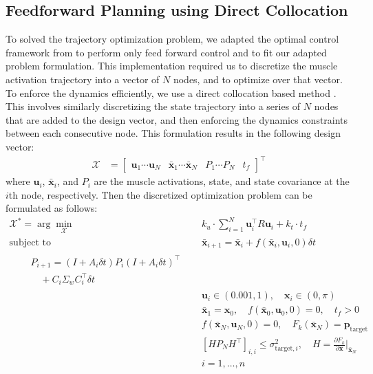 \documentclass[letterpaper, 10pt, conference]{ieeeconf}
\begin{document}
\subsection{Feedforward Planning using Direct Collocation}
To solved the trajectory optimization problem, we adapted the optimal control framework from \cite{stochastic_model} to perform only feed forward control and to fit our adapted problem formulation. This implementation required us to discretize the muscle activation trajectory into a vector of $N$ nodes, and to optimize over that vector. To enforce the dynamics efficiently, we use a direct collocation based method \cite{direct_collocation}. This involves similarly discretizing the state trajectory into a series of $N$ nodes that are added to the design vector, and then enforcing the dynamics constraints between each consecutive node. This formulation results in the following design vector:
\begin{align}
    \mathcal{X} &= \begin{bmatrix}
        \mathbf{u}_1  \cdots \mathbf{u}_N & \mathbf{\bar{x}}_1 \cdots \mathbf{\bar{x}}_N & P_1 \cdots P_N & t_f
    \end{bmatrix}^\top
\end{align}
where $\mathbf{u}_i$, $\mathbf{\bar{x}}_i$, and $P_i$ are the muscle activations, state, and state covariance at the $i$th node, respectively. Then the discretized optimization problem can be formulated as follows:
\begin{align}
    \mathcal{X}^* = \arg\min_{\mathcal{X}} &\quad k_u \cdot \sum_{i=1}^{N} \mathbf{u}_i^\top R \mathbf{u}_i + k_t \cdot t_f \label{eq:dcost} \\
    \text{subject to} &\quad \mathbf{\bar{x}}_{i+1} = \mathbf{\bar{x}}_i + f(\mathbf{\bar{x}}_i, \mathbf{u}_i, 0) \delta t \\
    \begin{split}
        &\quad P_{i+1} = (I + A_i \delta t)P_i(I + A_i \delta t)^\top \\
        &\quad \quad + C_i \Sigma_w C_i^\top \delta t
    \end{split} \label{test} \\
    &\quad \mathbf{u}_i \in (0.001, 1), \quad \mathbf{x}_i \in (0, \pi) \\
    &\quad \mathbf{\bar{x}}_1 = \mathbf{x}_0, \quad f(\mathbf{\bar{x}}_0, \mathbf{u}_0, 0) = 0, \quad t_f > 0 \\
    &\quad f(\mathbf{\bar{x}}_N, \mathbf{u}_N, 0) = 0, \quad F_k(\mathbf{\bar{x}}_N) = \mathbf{p}_{\text{target}} \label{eq:dtarget_constraint} \\
    &\quad [HP_NH^\top]_{i,i} \leq \sigma_{\text{target}, i}^2, \quad H = \frac{\partial F_k}{\partial \mathbf{x}}\bigg|_{\mathbf{\bar{x}}_N} \\
    &\quad i = 1, \ldots, n \label{eq:dtarget_variance_constraint}
\end{align}
\end{document}
